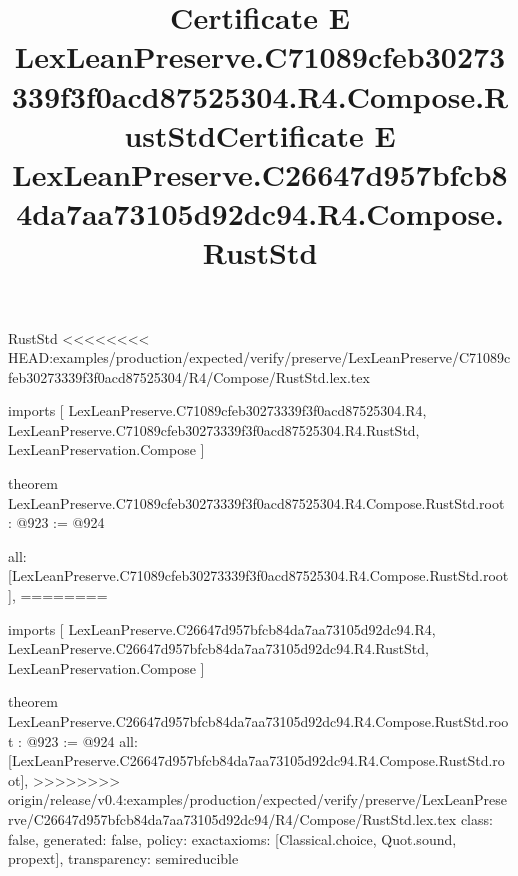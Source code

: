 \begin{lexlean}{RustStd}
<<<<<<<< HEAD:examples/production/expected/verify/preserve/LexLeanPreserve/C71089cfeb30273339f3f0acd87525304/R4/Compose/RustStd.lex.tex
\title{Certificate E LexLeanPreserve.C71089cfeb30273339f3f0acd87525304.R4.Compose.RustStd}
\begin{coremodule}
imports [
  LexLeanPreserve.C71089cfeb30273339f3f0acd87525304.R4,
  LexLeanPreserve.C71089cfeb30273339f3f0acd87525304.R4.RustStd,
  LexLeanPreservation.Compose
]

theorem LexLeanPreserve.C71089cfeb30273339f3f0acd87525304.R4.Compose.RustStd.root : @923 := @924 {
  all: [LexLeanPreserve.C71089cfeb30273339f3f0acd87525304.R4.Compose.RustStd.root],
========
\title{Certificate E LexLeanPreserve.C26647d957bfcb84da7aa73105d92dc94.R4.Compose.RustStd}
\begin{coremodule}
imports [
  LexLeanPreserve.C26647d957bfcb84da7aa73105d92dc94.R4,
  LexLeanPreserve.C26647d957bfcb84da7aa73105d92dc94.R4.RustStd,
  LexLeanPreservation.Compose
]

theorem LexLeanPreserve.C26647d957bfcb84da7aa73105d92dc94.R4.Compose.RustStd.root : @923 := @924 {
  all: [LexLeanPreserve.C26647d957bfcb84da7aa73105d92dc94.R4.Compose.RustStd.root],
>>>>>>>> origin/release/v0.4:examples/production/expected/verify/preserve/LexLeanPreserve/C26647d957bfcb84da7aa73105d92dc94/R4/Compose/RustStd.lex.tex
  class: false,
  generated: false,
  policy: exact{axioms: [Classical.choice, Quot.sound, propext]},
  transparency: semireducible
}


\end{coremodule}}
\end{coremodule}
\end{lexlean}
